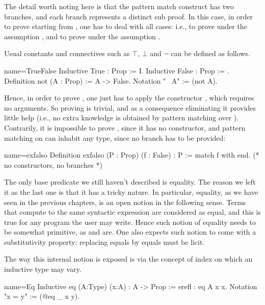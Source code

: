 The detail worth noting here is that the pattern match construct has two
branches, and each branch represents a distinct sub proof.  In this
case, in order to prove  starting from ,
one has to deal with all cases: i.e., to prove  under the
assumption , and to prove 
under the assumption .

Usual constants and connectives such as $\top$, $\bot$ and $\neg$
can be defined as follows.

\begin{coq}{name=TrueFalse}{}
Inductive True : Prop := I.
Inductive False : Prop := .
Definition not (A : Prop) := A -> False.
Notation "~ A" := (not A).
\end{coq}

Hence, in order to prove , one just has to apply the
constructor , which requires no arguments.
So proving  is trivial, and as a consequence eliminating it
provides little help (i.e., no extra knowledge is obtained by pattern matching
over ).  Contrarily, it is impossible to prove , since it has no
constructor, and pattern matching on  can inhabit any type, since no
branch has to be provided:

\begin{coq}{name=exfalso}{}
Definition exfalso (P : Prop) (f : False) : P :=
  match f with end.  (* no constructors, no branches *)
\end{coq}

The only base predicate we still haven't described is equality.  The reason we
left it as the last one is that it has a tricky nature.  In particular,
equality, as we have seen in the previous chapters, is an open notion
in the following sense.  Terms that compute to the same syntactic expression
are considered as equal, and this is true for any program the user may write.
Hence such notion of equality needs to be somewhat primitive, as
 and  are.  One also expects such notion to come
with a substitutivity property: replacing equals by equals must be licit.

The way this internal notion is exposed is via the concept of index
on which an inductive type may vary.

\begin{coq}{name=Eq}{}
Inductive eq (A:Type) (x:A) : A -> Prop := erefl : eq A x x.
Notation "x = y" := (@eq _ x y).
\end{coq}

